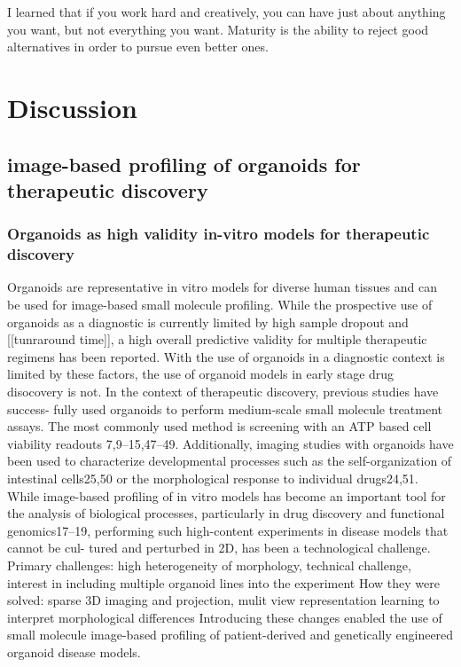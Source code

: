 \begin{savequote}[75mm]
I learned that if you work hard and creatively, you can have just about anything you want, but not everything you want. Maturity is the ability to reject good alternatives in order to pursue even better ones.

\end{savequote}

\chapter{Discussion}


\section{image-based profiling of organoids for therapeutic discovery}

\subsection{Organoids as high validity in-vitro models for therapeutic discovery}
Organoids are representative in vitro models for diverse human tissues and can be used for image-based small molecule profiling. While the prospective use of organoids as a diagnostic is currently limited by high sample dropout and [[tunraround time]], a high overall predictive validity for multiple therapeutic regimens has been reported. With the use of organoids in a diagnostic context is limited by these factors, the use of organoid models in early stage drug disocovery is not. In the context of therapeutic discovery, previous studies have success- fully used organoids to perform medium-scale small molecule treatment assays. The most commonly used method is screening with an ATP based cell viability readouts 7,9–15,47–49. Additionally, imaging studies with organoids have been used to characterize developmental processes such as the self-organization of intestinal cells25,50 or the morphological response to individual drugs24,51. While image-based profiling of in vitro models has become an important tool for the analysis of biological processes, particularly in drug discovery and functional genomics17–19, performing such high-content experiments in disease models that cannot be cul- tured and perturbed in 2D, has been a technological challenge. 
Primary challenges: high heterogeneity of morphology, technical challenge, interest in including multiple organoid lines into the experiment
How they were solved: 
sparse 3D imaging and projection, mulit view representation learning to interpret morphological differences
Introducing these changes enabled the use of small molecule image-based profiling of patient-derived and genetically engineered organoid disease models. 
\par

